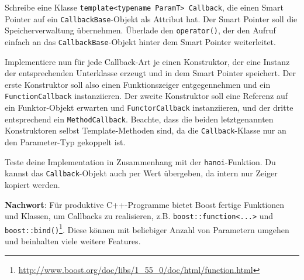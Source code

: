 Schreibe eine Klasse \lstinline{template<typename ParamT> Callback}, die einen Smart Pointer auf ein \lstinline{CallbackBase}-Objekt als Attribut hat. Der Smart Pointer soll die Speicherverwaltung übernehmen. Überlade den \lstinline{operator()}, der den Aufruf einfach an das \lstinline{CallbackBase}-Objekt hinter dem Smart Pointer weiterleitet.

Implementiere nun für jede Callback-Art je einen Konstruktor, der eine Instanz der entsprechenden Unterklasse erzeugt und in dem Smart Pointer speichert.
Der erste Konstruktor soll also einen Funktionszeiger entgegennehmen und ein \lstinline{FunctionCallback} instanziieren.
Der zweite Konstruktor soll eine Referenz auf ein Funktor-Objekt erwarten und  \lstinline{FunctorCallback} instanziieren, und der dritte entsprechend ein \lstinline{MethodCallback}.
Beachte, dass die beiden letztgenannten Konstruktoren selbst Template-Methoden sind, da die \lstinline{Callback}-Klasse nur an den Parameter-Typ gekoppelt ist.

Teste deine Implementation in Zusammenhang mit der \lstinline{hanoi}-Funktion. Du kannst das \lstinline{Callback}-Objekt auch per Wert übergeben, da intern nur Zeiger kopiert werden.


\textbf{Nachwort}:
Für produktive C++-Programme bietet Boost fertige Funktionen und Klassen, um Callbacks zu realisieren, z.B. \lstinline{boost::function<...>} und \lstinline{boost::bind()}\footnote{\url{http://www.boost.org/doc/libs/1_55_0/doc/html/function.html}}. Diese können mit beliebiger Anzahl von Parametern umgehen und beinhalten viele weitere Features.
